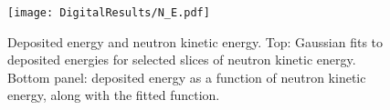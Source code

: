 \documentclass[main.tex]{subfiles}
\begin{document}
\begin{figure}[ht]
    \centering
        \texttt{[image: DigitalResults/N\_E.pdf]}
        \caption[Deposited energy and neutron kinetic energy.]{Deposited energy and neutron kinetic energy. Top: Gaussian fits to deposited energies for selected slices of neutron kinetic energy. Bottom panel: deposited energy as a function of neutron kinetic energy, along with the fitted function.}
    \label{fig:N_E} 
\end{figure}
\end{document}
